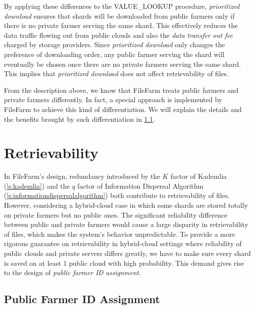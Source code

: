 By applying these differences to the VALUE\_LOOKUP procedure, \textit{prioritized download} ensures that shards will be downloaded from public farmers only if there is no private farmer serving the same shard. This effectively reduces the data traffic flowing out from public clouds and also the \textit{data transfer out fee} charged by storage providers. Since \textit{prioritized download} only changes the preference of downloading order, any public farmer serving the shard will eventually be chosen once there are no private farmers serving the same shard. This implies that \textit{prioritized download} does not affect retrievability of files.

From the description above, we know that FileFarm treats public farmers and private farmers differently. In fact, a special approach is implemented by FileFarm to achieve this kind of differentiation. We will explain the details and the benefits brought by such differentiation in \ref{ss:publicfarmeridassignment}.

\section{Retrievability}
\label{s:retrievability}

In FileFarm's design, redundancy introduced by the $K$ factor of Kademlia (\ref{s:kademlia}) and the $q$ factor of Information Dispersal Algorithm (\ref{s:informationdispersalalgorithm}) both contribute to retrievability of files. However, considering a hybrid-cloud case in which some shards are stored totally on private farmers but no public ones. The significant reliability difference between public and private farmers would cause a large disparity in retrievability of files, which makes the system's behavior unpredictable. To provide a more rigorous guarantee on retrievability in hybrid-cloud settings where reliability of public clouds and private servers differs greatly, we have to make sure every shard is saved on at least 1 public cloud with high probability. This demand gives rise to the design of \textit{public farmer ID assignment}.

\subsection{Public Farmer ID Assignment}
\label{ss:publicfarmeridassignment}

